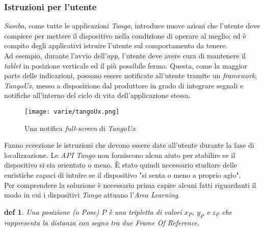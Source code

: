 \subsubsection{Istruzioni per l'utente}
\label{cap:istruzioni-per-utente}
\emph{Samba}, come tutte le applicazioni \emph{Tango}, introduce nuove azioni che l'utente deve compiere per mettere il dispositivo nella condizione di operare al meglio; ed è compito degli applicativi istruire l'utente sul comportamento da tenere.\\
Ad esempio, durante l'avvio dell'\emph{app}, l'utente deve avere cura di mantenere il \emph{tablet} in posizione verticale ed il più possibile fermo. Questa, come la maggior parte delle indicazioni, possono essere notificate all'utente tramite un \emph{framework}, \emph{TangoUx}, messo a disposizione dal produttore in grado di integrare segnali e notifiche all'interno del ciclo di vita dell'applicazione stessa.\\
\begin{figure}[H] 
    \centering 
    \texttt{[image: varie/tangoUx.png]} 
    \caption{Una notifica \emph{full-screen} di \emph{TangoUx}}
    \label{figure:grafico_variazioni_pose}
\end{figure}
Fanno eccezione le istruzioni che devono essere date all'utente durante la fase di localizzazione. Le \emph{API Tango} non forniscono alcun aiuto per stabilire se il dispositivo si sia orientato o meno. È stato quindi necessario studiare delle euristiche capaci di intuire se il dispositivo "si senta o meno a proprio agio".\\

Per comprendere la soluzione è necessario prima capire alcuni fatti riguardanti il modo in cui i dispositivi \emph{Tango} attuano l'\emph{Area Learning}.\\

\newtheorem{pose}{def}
\begin{pose}
	Una \emph{posizione} (o \emph{Pose}) $P$ è una tripletta di valori $x_{P}$, $y_{P}$ e $z_{P}$ che rappresenta la distanza con segno tra due \emph{Frame Of Reference}.\\
\end{pose}

